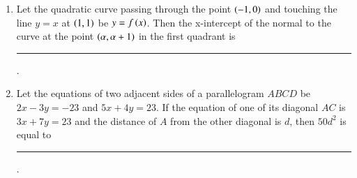 \documentclass[journal]{IEEEtran}
\begin{document}
\begin{enumerate}[start = 16]
\item Let the quadratic curve passing through the point $\left(-1,0\right)$ and touching the line $y=x$ at $\left(1,1\right)$ be $y=f\left(x\right)$. Then the x-intercept of the normal to the curve at the point $\left(\alpha,\alpha + 1\right)$ in the first quadrant is \rule{2cm}{0.4mm}.

\item Let the equations of two adjacent sides of a parallelogram $ABCD$ be $2x-3y=-23$ and $5x + 4y = 23$. If the equation of one of its diagonal $AC$ is $3x + 7y = 23$ and the distance of $A$ from the other diagonal is $d$, then $50d^2$ is equal to \rule{2cm}{0.4mm}.

	
\end{enumerate}
\end{document}
